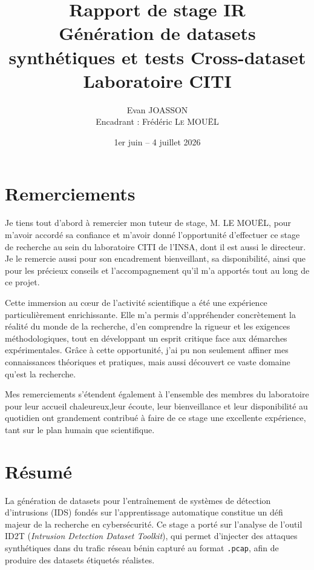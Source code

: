 \documentclass[12pt, a4paper]{report}
\title{
    {\Large Rapport de stage IR} \\[0.5em]
    {\huge \textbf{Génération de datasets synthétiques et tests Cross-dataset}} \\[1em]
    {\large Laboratoire CITI}
}
\author{
    Evan \textsc{JOASSON} \\[0.3em]
    \small Encadrant : Frédéric \textsc{Le MOUËL}
}
\date{1er juin -- 4 juillet 2026}
\begin{document}

\maketitle
\thispagestyle{empty}
\newpage

\chapter*{Remerciements}

Je tiens tout d’abord à remercier mon tuteur de stage, M. LE MOUËL, pour m'avoir accordé sa confiance et m'avoir donné l'opportunité d'effectuer ce stage de recherche au sein du laboratoire CITI de l'INSA, dont il est aussi le directeur. Je le remercie aussi pour son encadrement bienveillant, sa disponibilité, ainsi que pour les précieux conseils et l'accompagnement qu'il m'a apportés tout au long de ce projet.

Cette immersion au cœur de l'activité scientifique a été une expérience particulièrement enrichissante. Elle m'a permis d'appréhender concrètement la réalité du monde de la recherche, d'en comprendre la rigueur et les exigences méthodologiques, tout en développant un esprit critique face aux démarches expérimentales. Grâce à cette opportunité, j'ai pu non seulement affiner mes connaissances théoriques et pratiques, mais aussi découvert ce vaste domaine qu'est la recherche.

Mes remerciements s'étendent également à l'ensemble des membres du laboratoire pour leur accueil chaleureux,leur écoute, leur bienveillance et leur disponibilité au quotidien ont grandement contribué à faire de ce stage une excellente expérience, tant sur le plan humain que scientifique.

\newpage

\chapter*{Résumé}

La génération de datasets pour l'entraînement de systèmes de détection d'intrusions (IDS)
fondés sur l'apprentissage automatique constitue un défi majeur de la recherche en
cybersécurité. Ce stage a porté sur l'analyse de l'outil ID2T (\textit{Intrusion Detection
Dataset Toolkit}), qui permet d'injecter des attaques synthétiques dans du trafic réseau
bénin capturé au format \texttt{.pcap}, afin de produire des datasets étiquetés réalistes.
 
\end{document}
